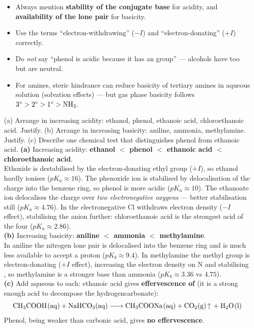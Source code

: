 \documentclass[11pt]{article}
\begin{document}
\begin{attention}
\begin{itemize}
\item Always mention \textbf{stability of the conjugate base} for acidity, and \textbf{availability of the lone pair} for basicity.
\item Use the terms ``electron-withdrawing'' ($-I$) and ``electron-donating'' ($+I$) correctly.
\item Do \emph{not} say ``phenol is acidic because it has an  group'' --- alcohols have  too but are neutral.
\item For amines, steric hindrance can reduce basicity of tertiary amines in aqueous solution (solvation effects) --- but gas phase basicity follows $3^\circ > 2^\circ > 1^\circ > \ce{NH3}$.
\end{itemize}
\end{attention}

\begin{exoresolu}
(a) Arrange in increasing acidity: ethanol, phenol, ethanoic acid, chloroethanoic acid. Justify. (b) Arrange in increasing basicity: aniline, ammonia, methylamine. Justify. (c) Describe one chemical test that distinguishes phenol from ethanoic acid.
\tcblower
\textbf{(a)} Increasing acidity: \textbf{ethanol $<$ phenol $<$ ethanoic acid $<$ chloroethanoic acid}.\\
Ethoxide  is destabilised by the electron-donating ethyl group ($+I$), so ethanol hardly ionises ($pK_a \approx 16$). The phenoxide ion  is stabilised by delocalisation of the charge into the benzene ring, so phenol is more acidic ($pK_a \approx 10$). The ethanoate ion  delocalises the charge over \emph{two electronegative oxygens} --- better stabilisation still ($pK_a \approx 4.76$). In  the electronegative Cl withdraws electron density ($-I$ effect), stabilising the anion further: chloroethanoic acid is the strongest acid of the four ($pK_a \approx 2.86$).\\[3pt]
\textbf{(b)} Increasing basicity: \textbf{aniline $<$ ammonia $<$ methylamine}.\\
In aniline the nitrogen lone pair is delocalised into the benzene ring and is much less available to accept a proton ($pK_b \approx 9.4$). In methylamine the methyl group is electron-donating ($+I$ effect), increasing the electron density on N and stabilising , so methylamine is a stronger base than ammonia ($pK_b \approx 3.36$ vs $4.75$).\\[3pt]
\textbf{(c)} Add aqueous  to each: ethanoic acid gives \textbf{effervescence of } (it is a strong enough acid to decompose the hydrogencarbonate):
\[
\ce{CH3COOH(aq) + NaHCO3(aq) -> CH3COONa(aq) + CO2(g) ^ + H2O(l)}
\]
Phenol, being weaker than carbonic acid, gives \textbf{no effervescence}.
\end{exoresolu}
\end{document}
